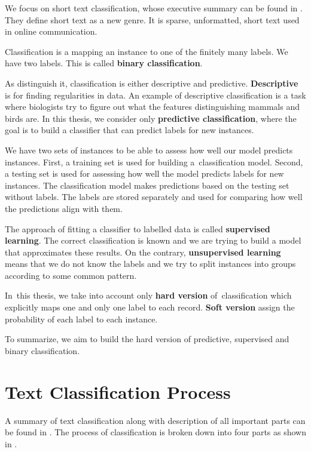 We focus on short text classification, whose
executive summary can be found in \citet{Song14}.
They define short text as a new genre.
It is sparse, unformatted, short text used in online communication.

Classification is a mapping an instance to one of the finitely many labels.
We have two labels.
This is called \textbf{binary classification}.

As \citet{TanBachKum08} distinguish it, classification is either descriptive and predictive.
\textbf{Descriptive} is for finding regularities in data.
An example of descriptive classification is a task where
biologists try to figure out what the features distinguishing mammals and birds are.
In this thesis, we consider only \textbf{predictive classification}, where the goal is to build a classifier
that can predict labels for new instances.

We have two sets of instances to be able to assess how well our model predicts instances.
First, a training set is  used for building a~classification model.
Second, a testing set is used for assessing how well the model predicts labels for new instances.
The classification model makes predictions based on the testing set without labels.
The labels are stored separately and used for comparing how well the predictions align with them.

The approach of fitting a classifier to labelled data is called \textbf{supervised learning}.
The correct classification is known and we are trying to build a model that approximates these results.
On the contrary, \textbf{unsupervised learning} means that we do not know the labels and we try to split instances into groups according to some common pattern.

In~this thesis, we take into account only \textbf{hard version} of~classification which explicitly maps one and only one label to each record.  
\textbf{Soft version} assign the probability of each label to each instance.

To summarize, we aim to build the hard version of predictive, supervised and binary classification.

\section{Text Classification Process}

A summary of text classification along with description of all important parts can be found in
\citet{khan2010review}.
The process of classification is broken down into four parts as shown in .

